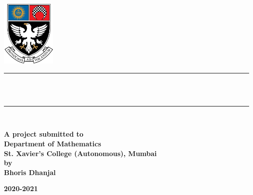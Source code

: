 \begin{titlepage}

\newcommand{\HRule}{\rule{\linewidth}{0.5mm}} %




\center %

\begin{center}
    



\includegraphics[width=0.2\textwidth]{Images/xavierslogo.png}\\[1.5cm]
\HRule \\[0.4cm]
{ \huge \bfseries \reporttitle}\\[0.4cm] %
\HRule \\[2.5cm]
\end{center}
\textbf{
\large A project submitted to\\
\large Department of Mathematics\\
\large St. Xavier’s College (Autonomous), Mumbai\\
\large by\\[1cm]
\large Bhoris Dhanjal}

\vfill %
\textbf{
2020-2021}
\end{titlepage}
